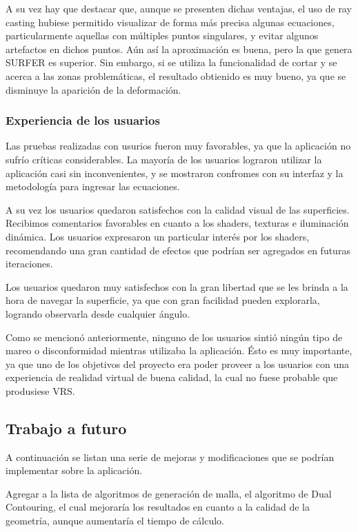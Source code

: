 \documentclass[12pt]{article}
\begin{document}
A su vez hay que destacar que, aunque se presenten dichas ventajas, el uso de ray casting hubiese permitido visualizar de forma más precisa algunas ecuaciones, particularmente aquellas con múltiples puntos singulares, y evitar algunos artefactos en dichos puntos. Aún así la aproximación es buena, pero la que genera SURFER es superior. Sin embargo, si se utiliza la funcionalidad de cortar y se acerca a las zonas problemáticas, el resultado obtienido es muy bueno, ya que se disminuye la aparición de la deformación.

\subsubsection{Experiencia de los usuarios}
\noindent Las pruebas realizadas con usurios fueron muy favorables, ya que la aplicación no sufrío críticas considerables. La mayoría de los usuarios lograron utilizar la aplicación casi sin inconvenientes, y se mostraron confromes con su interfaz y la metodología para ingresar las ecuaciones.

A su vez los usuarios quedaron satisfechos con la calidad visual de las superficies. Recibimos comentarios favorables en cuanto a los shaders, texturas e iluminación dinámica. Los usuarios expresaron un particular interés por los shaders, recomendando una gran cantidad de efectos que podrían ser agregados en futuras iteraciones. 

Los usuarios quedaron muy satisfechos con la gran libertad que se les brinda a la hora de navegar la superficie, ya que con gran facilidad pueden explorarla, logrando observarla desde cualquier ángulo.

Como se mencionó anteriormente, ninguno de los usuarios sintió ningún tipo de mareo o disconformidad mientras utilizaba la aplicación. Ésto es muy importante, ya que uno de los objetivos del proyecto era poder proveer a los usuarios con una experiencia de realidad virtual de buena calidad, la cual no fuese probable que produsiese VRS. 

\subsection{Trabajo a futuro}
\noindent A continuación se listan una serie de mejoras y modificaciones que se podrían implementar sobre la aplicación.

Agregar a la lista de algoritmos de generación de malla, el algoritmo de Dual Contouring\cite{dualcontour}, el cual mejoraría los resultados en cuanto a la calidad de la geometría, aunque aumentaría el tiempo de cálculo. 
\end{document}
